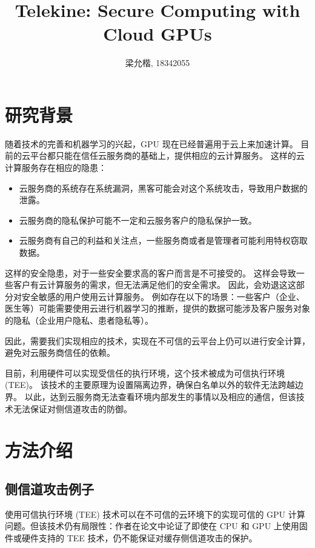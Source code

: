 \documentclass{ctexart}
\begin{document}
\title{Telekine: Secure Computing with Cloud GPUs}
\author{梁允楷, 18342055}
\date{}
\maketitle    
\section{研究背景}

随着技术的完善和机器学习的兴起，GPU 现在已经普遍用于云上来加速计算。
目前的云平台都只能在信任云服务商的基础上，提供相应的云计算服务。
这样的云计算服务存在相应的隐患：

\begin{itemize}
    \item 云服务商的系统存在系统漏洞，黑客可能会对这个系统攻击，导致用户数据的泄露。
    \item 云服务商的隐私保护可能不一定和云服务客户的隐私保护一致。
    \item 云服务商有自己的利益和关注点，一些服务商或者是管理者可能利用特权窃取数据。
\end{itemize}

这样的安全隐患，对于一些安全要求高的客户而言是不可接受的。
这样会导致一些客户有云计算服务的需求，但无法满足他们的安全需求。
因此，会劝退这这部分对安全敏感的用户使用云计算服务。
例如存在以下的场景：一些客户（企业、医生等）可能需要使用云进行机器学习的推断，提供的数据可能涉及客户服务对象的隐私（企业用户隐私、患者隐私等）。

因此，需要我们实现相应的技术，实现在不可信的云平台上仍可以进行安全计算，避免对云服务商信任的依赖。

目前，利用硬件可以实现受信任的执行环境，这个技术被成为可信执行环境 (TEE)\cite{jang2019heterogeneous}。
该技术的主要原理为设置隔离边界，确保白名单以外的软件无法跨越边界。
以此，达到云服务商无法查看环境内部发生的事情以及相应的通信，但该技术无法保证对侧信道攻击的防御。

\section{方法介绍}

\subsection{侧信道攻击例子}

使用可信执行环境 (TEE) 技术可以在不可信的云环境下的实现可信的 GPU 计算问题。但该技术仍有局限性：作者在论文\cite{246310}中论证了即使在 CPU 和 GPU 上使用固件或硬件支持的 TEE 技术，仍不能保证对缓存侧信道攻击的保护。
\end{document}
